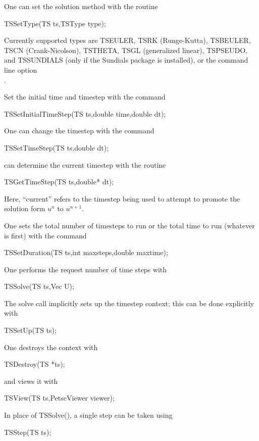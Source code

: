 \noindent One can set the solution method with the routine
\begin{tabbing}
 TSSetType(TS ts,TSType type);
\end{tabbing}
Currently supported types are TSEULER, TSRK (Runge-Kutta), 
TSBEULER, TSCN (Crank-Nicolson), TSTHETA, TSGL (generalized linear), TSPSEUDO, and  
TSSUNDIALS (only if the Sundials package is installed),  
or the command line option \\
.
 


\noindent Set the initial time and timestep with the command
\begin{tabbing}
 TSSetInitialTimeStep(TS ts,double time,double dt);
\end{tabbing}
One can change the timestep with the command
\begin{tabbing}
 TSSetTimeStep(TS ts,double dt);
\end{tabbing}
can determine the current timestep with the routine
\begin{tabbing}
 TSGetTimeStep(TS ts,double* dt);
\end{tabbing}
Here, ``current'' refers to the timestep being used to attempt to
promote the solution form $ u^n $ to $ u^{n+1}. $

\noindent One sets the total number of timesteps to run or the total time to run
(whatever is first) with the command
\begin{tabbing}
 TSSetDuration(TS ts,int maxsteps,double maxtime);
\end{tabbing}
One performs the request number of time steps with
\begin{tabbing}
  TSSolve(TS ts,Vec U);
\end{tabbing}
The solve call implicitly sets up the timestep context;
this can be done explicitly with
\begin{tabbing}
 TSSetUp(TS ts);
\end{tabbing}
One destroys the context with
\begin{tabbing}
 TSDestroy(TS *ts);
\end{tabbing}
and views it with
\begin{tabbing}
 TSView(TS ts,PetscViewer viewer);
\end{tabbing}
In place of TSSolve(), a single step can be taken using
\begin{tabbing}
TSStep(TS ts);
\end{tabbing}


